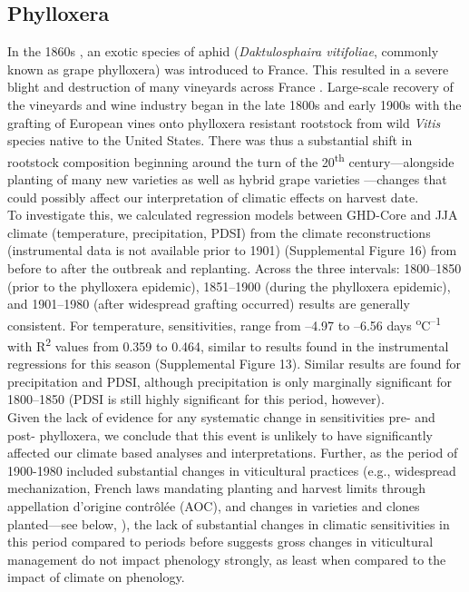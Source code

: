 \documentclass[12pt]{article}
\begin{document}
\subsection*{Phylloxera}
\noindent In the 1860s \cite{Lachiver1988}, an exotic species of aphid (\emph{Daktulosphaira vitifoliae}, commonly known as grape phylloxera) was introduced to France. This resulted in a severe blight and destruction of many vineyards across France \cite{Lachiver1988,Loubere1978,Loubere1990,Paul1996,Bouquet2002}. Large-scale recovery of the vineyards and wine industry began in the late 1800s and early 1900s with the grafting of European vines onto phylloxera resistant rootstock from wild \emph{Vitis} species native to the United States. There was thus a substantial shift in rootstock composition beginning around the turn of the 20\textsuperscript{th} century---alongside planting of many new varieties as well as hybrid grape varieties \cite{Lachiver1988,Bouquet2002}---changes that could possibly affect our interpretation of climatic effects on harvest date.\\
\indent To investigate this, we calculated regression models between GHD-Core and JJA climate (temperature, precipitation, PDSI) from the climate reconstructions (instrumental data is not available prior to 1901) (Supplemental Figure 16) from before to after the outbreak and replanting. Across the three intervals: 1800--1850 (prior to the phylloxera epidemic), 1851--1900 (during the phylloxera epidemic), and 1901--1980 (after widespread grafting occurred) results are generally consistent. For temperature, sensitivities, range from --4.97 to --6.56 days \textsuperscript{o}C\textsuperscript{--1} with R\textsuperscript{2} values  from 0.359 to 0.464, similar to results found in the instrumental regressions for this season (Supplemental Figure 13). Similar results are found for precipitation and PDSI, although precipitation is only marginally significant for 1800--1850 (PDSI is still highly significant for this period, however). \\
\indent Given the lack of evidence for any systematic change in sensitivities pre- and post- phylloxera, we conclude that this event is unlikely to have significantly affected our climate based analyses and interpretations. Further, as the period of 1900-1980 included substantial changes in viticultural practices (e.g., widespread mechanization, French laws mandating planting and harvest limits through appellation d'origine contr\^ol\'ee (AOC), and changes in varieties and clones planted---see below, \cite{Loubere1990,Paul1996}), the lack of substantial changes in climatic sensitivities in this period compared to periods before suggests gross changes in viticultural management do not impact phenology strongly, as least when compared to the impact of climate on phenology.
\end{document}
